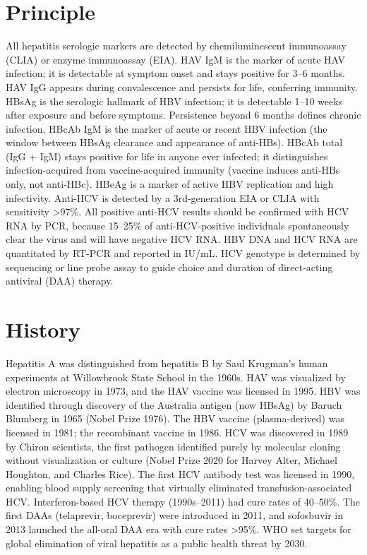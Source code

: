 \section*{Principle}
All hepatitis serologic markers are detected by chemiluminescent immunoassay (CLIA) or enzyme immunoassay (EIA). HAV IgM is the marker of acute HAV infection; it is detectable at symptom onset and stays positive for 3--6 months. HAV IgG appears during convalescence and persists for life, conferring immunity. HBsAg is the serologic hallmark of HBV infection; it is detectable 1--10 weeks after exposure and before symptoms. Persistence beyond 6 months defines chronic infection. HBcAb IgM is the marker of acute or recent HBV infection (the window between HBsAg clearance and appearance of anti-HBs). HBcAb total (IgG + IgM) stays positive for life in anyone ever infected; it distinguishes infection-acquired from vaccine-acquired immunity (vaccine induces anti-HBs only, not anti-HBc). HBeAg is a marker of active HBV replication and high infectivity. Anti-HCV is detected by a 3rd-generation EIA or CLIA with sensitivity >97\%. All positive anti-HCV results should be confirmed with HCV RNA by PCR, because 15--25\% of anti-HCV-positive individuals spontaneously clear the virus and will have negative HCV RNA. HBV DNA and HCV RNA are quantitated by RT-PCR and reported in IU/mL. HCV genotype is determined by sequencing or line probe assay to guide choice and duration of direct-acting antiviral (DAA) therapy.

\section*{History}
Hepatitis A was distinguished from hepatitis B by Saul Krugman's human experiments at Willowbrook State School in the 1960s. HAV was visualized by electron microscopy in 1973, and the HAV vaccine was licensed in 1995. HBV was identified through discovery of the Australia antigen (now HBsAg) by Baruch Blumberg in 1965 (Nobel Prize 1976). The HBV vaccine (plasma-derived) was licensed in 1981; the recombinant vaccine in 1986. HCV was discovered in 1989 by Chiron scientists, the first pathogen identified purely by molecular cloning without visualization or culture (Nobel Prize 2020 for Harvey Alter, Michael Houghton, and Charles Rice). The first HCV antibody test was licensed in 1990, enabling blood supply screening that virtually eliminated transfusion-associated HCV. Interferon-based HCV therapy (1990s--2011) had cure rates of 40--50\%. The first DAAs (telaprevir, boceprevir) were introduced in 2011, and sofosbuvir in 2013 launched the all-oral DAA era with cure rates >95\%. WHO set targets for global elimination of viral hepatitis as a public health threat by 2030.

